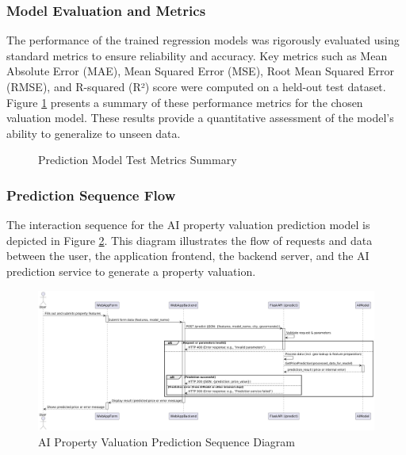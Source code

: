 \subsubsection{Model Evaluation and Metrics}
The performance of the trained regression models was rigorously evaluated using standard metrics to ensure reliability and accuracy. Key metrics such as Mean Absolute Error (MAE), Mean Squared Error (MSE), Root Mean Squared Error (RMSE), and R-squared (R²) score were computed on a held-out test dataset. Figure \ref{fig:model-test-metrics} presents a summary of these performance metrics for the chosen valuation model. These results provide a quantitative assessment of the model's ability to generalize to unseen data.

\begin{figure}[htbp]
    \centering
    \caption{Prediction Model Test Metrics Summary}
    \label{fig:model-test-metrics}
\end{figure}
\newpage

\subsubsection{Prediction Sequence Flow}
The interaction sequence for the AI property valuation prediction model is depicted in Figure \ref{fig:ai-prediction-sequence}. This diagram illustrates the flow of requests and data between the user, the application frontend, the backend server, and the AI prediction service to generate a property valuation.

\begin{figure}[htbp]
    \centering
    \includegraphics[width=1\textwidth]{images/sequence_AI_prediction_model.png} %
    \caption{AI Property Valuation Prediction Sequence Diagram}
    \label{fig:ai-prediction-sequence}
\end{figure}


